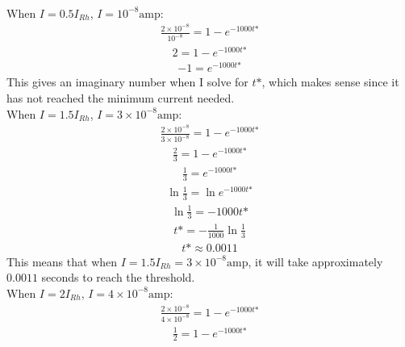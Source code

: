 \documentclass[11pt]{article}
\begin{document}
\begin{enumerate}[label=\arabic*.]
\begin{enumerate}[label=(\alph*)]
\vspace*{1\baselineskip}
\\
When $I = 0.5 I_{Rh}$, $I = 10^{-8} \text{amp}$:
\begin{align*}
\frac{2 \times 10^{-8}} {10^{-8}} = 1 - e^{-1000 t\text{*}}
\end{align*}
\begin{align*}
2 = 1 - e^{-1000 t\text{*}}
\end{align*}
\begin{align*}
-1 = e^{-1000 t\text{*}}
\end{align*}
This gives an imaginary number when I solve for $t\text{*}$, which makes sense since it has not reached the minimum current needed.
\vspace*{1\baselineskip}
\\
When $I = 1.5 I_{Rh}$, $I = 3 \times 10^{-8} \text{amp}$:
\begin{align*}
\frac{2 \times 10^{-8}} {3 \times 10^{-8}} = 1 - e^{-1000 t\text{*}}
\end{align*}
\begin{align*}
\frac{2} {3} = 1 - e^{-1000 t\text{*}}
\end{align*}
\begin{align*}
\frac{1} {3} = e^{-1000 t\text{*}}
\end{align*}
\begin{align*}
\ln{\frac{1} {3}} = \ln{e^{-1000 t\text{*}}}
\end{align*}
\begin{align*}
\ln{\frac{1} {3}} = -1000 t\text{*}
\end{align*}
\begin{align*}
t\text{*} = - \frac{1} {1000} \ln{\frac{1} {3}}
\end{align*}
\begin{align*}
t\text{*} \approx 0.0011
\end{align*}
This means that when $I = 1.5 I_{Rh} = 3 \times 10^{-8} \text{amp}$, it will take approximately $0.0011$ seconds to reach the threshold.
\vspace*{1\baselineskip}
\\
When $I = 2 I_{Rh}$, $I = 4 \times 10^{-8} \text{amp}$:
\begin{align*}
\frac{2 \times 10^{-8}} {4 \times 10^{-8}} = 1 - e^{-1000 t\text{*}}
\end{align*}
\begin{align*}
\frac{1} {2} = 1 - e^{-1000 t\text{*}}
\end{align*}
\begin{align*}

\end{align*}
\end{enumerate}
\end{enumerate}
\end{document}
